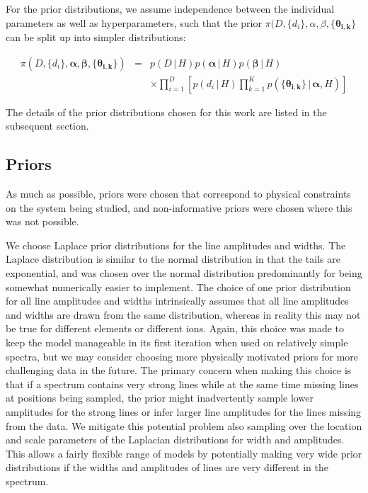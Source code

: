 \documentclass[12pt]{emulateapj}
\newcommand{\given}{\,|\,}
\newcommand{\pars}{\theta}
\begin{document}
For the prior distributions, we assume independence between the individual parameters as well as hyperparameters, such that the 
prior  $\pi(D, \{d_i\}, \alpha, \beta, \{\bm{\pars_{i,k}}\} $ can be split up into simpler distributions:

\begin{eqnarray}
\pi(D, \{d_i\}, \bm{\alpha}, \bm{\beta}, \{\bm{\pars_{i,k}}\} ) & = &  p(D \given H) p(\bm{\alpha} \given H) p(\bm{\beta} \given H)   \nonumber \\	
					& & \times \prod_{i=1}^{D}{\left[p(d_i \given H) \prod_{k=1}^{K}{p( \{\bm{\pars_{i,k}}\} \given \bm{\alpha}, H)}\right]} 
\end{eqnarray}

The details of the prior distributions chosen for this work are listed in the subsequent section.

\subsection{Priors}
\label{sec:priors}

As much as possible, priors were chosen that correspond to physical constraints on the system being studied, and non-informative priors were chosen where this was not possible. 

We choose Laplace prior distributions for the line amplitudes and widths. The Laplace distribution is similar to the normal distribution in that the tails are exponential, and was chosen over the normal distribution predominantly for being somewhat numerically easier to implement. The choice of one prior distribution for all line amplitudes and widths intrinsically assumes that all line amplitudes and widths are drawn from the same distribution, whereas in reality this may not be true for different elements or different ions. Again, this choice was made to keep the model manageable in its first iteration when used on relatively simple spectra, but we may consider choosing more physically motivated priors for more challenging data in the future.
The primary concern when making this choice is that if a spectrum contains very strong lines while at the same time missing lines at positions being sampled, the prior might inadvertently sample lower amplitudes for the strong lines or infer larger line amplitudes for the lines missing from the data.
We mitigate this potential problem also sampling over the location and scale parameters of the Laplacian distributions for width and amplitudes. This allows a fairly flexible range of models by potentially making very wide prior distributions if the widths and amplitudes of lines are very different in the spectrum.
\end{document}
